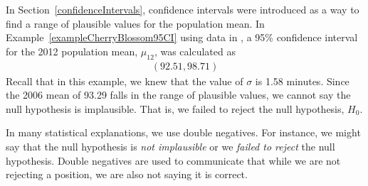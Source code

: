 In Section~\ref{confidenceIntervals}, confidence intervals were introduced as a way to find a range of plausible values for the population mean. 
In Example~\ref{exampleCherryBlossom95CI} using data in
, a 95\% confidence interval for the 2012 population mean, $\mu_{12}$, was calculated as
\begin{eqnarray*}
(92.51, 98.71)
\end{eqnarray*}
Recall that in this example, we knew that the value of $\sigma$ is 1.58 minutes.
Since the 2006 mean of 93.29 falls in the range of plausible values, we cannot say the null hypothesis is implausible. That is, we failed to reject the null hypothesis, $H_0$. 

\begin{tipBox}{
In many statistical explanations, we use double negatives. For instance, we might say that the null hypothesis is \emph{not implausible} or we \emph{failed to reject} the null hypothesis. Double negatives are used to communicate that while we are not rejecting a position, we are also not saying it is correct.}
\end{tipBox}


